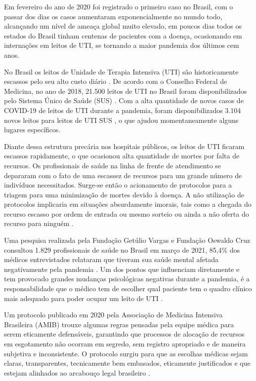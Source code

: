 \documentclass[12pt]{article}
\begin{document}
Em fevereiro do ano de 2020 foi registrado o primeiro caso no Brasil, com o passar dos dias os casos aumentaram exponencialmente no mundo todo, alcançando um nível de ameaça global muito elevado, em poucos dias todos os estados do Brasil tinham centenas de pacientes com a doença, ocasionando em internações em leitos de UTI, se tornando a maior pandemia dos últimos cem anos.

No Brasil os leitos de Unidade de Terapia Intensiva (UTI)  são historicamente escassos pelo seu alto custo diário \cite{murthy2015intensive}. De acordo com o Conselho Federal de Medicina, no ano de 2018, 21.500 leitos de UTI no Brasil foram disponibilizados pelo Sistema Único de Saúde (SUS) \cite{cfm2018,cfm2020}. Com a alta quantidade de novos casos de COVID-19 de leitos de UTI durante a pandemia, foram disponibilizados 3.104 novos leitos para leitos de UTI SUS \cite{cotrim2020crescimento}, o que ajudou momentaneamente alguns lugares específicos.

Diante dessa estrutura precária nos hospitais públicos, os leitos de UTI  ficaram escassos rapidamente, o que ocasionou alta quantidade de mortes por falta de recursos. Os profissionais de saúde na linha de frente de atendimento se depararam com o fato de uma escassez de recursos para um grande número de indivíduos necessitados. Surge-se então o acionamento de protocolos para a triagem para uma minimização de mortes devido à doença. A não utilização de protocolos implicaria em situações absurdamente imorais, tais como a chegada do recurso escasso por ordem de entrada ou mesmo sorteio ou ainda a não oferta do recurso para ninguém \cite{costa2020protocolos}.

Uma pesquisa realizada pela Fundação Getúlio Vargas e Fundação Oswaldo Cruz consultou 1.829 profissionais de saúde no Brasil em março de 2021, 85,4\% dos médicos entrevistados relataram que tiveram sua saúde mental afetada negativamente pela pandemia \cite{paulomotoryn2021}. Um dos pontos que influenciam diretamente e tem provocado grandes mudanças psicológicas negativas durante a pandemia, é a responsabilidade que o médico tem de escolher qual paciente tem o quadro clínico mais adequado para poder ocupar um leito de UTI \cite{teixeira2020processo}.

Um protocolo publicado em 2020 pela Associação de Medicina Intensiva Brasileira (AMIB) trouxe algumas regras pensadas pela equipe médica para serem eticamente defensáveis, garantindo que processos de alocação de recursos em esgotamento não ocorram em segredo, sem registro apropriado e de maneira subjetiva e inconsistente. O protocolo surgiu para que as escolhas médicas sejam claras, transparentes, tecnicamente bem embasados, eticamente justificados e que estejam alinhados ao arcabouço legal brasileiro \cite{kretzer2020protocolo}.
\end{document}
